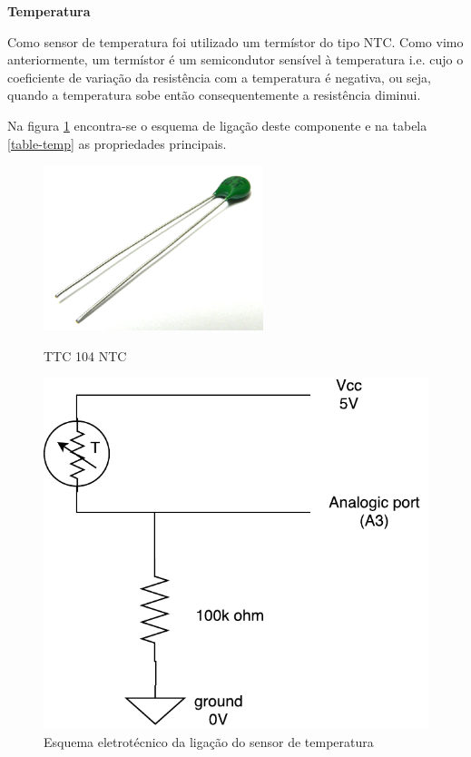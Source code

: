 \textbf{Temperatura}


Como sensor de temperatura foi utilizado um termístor do tipo \ac{NTC}. Como vimo anteriormente, um termístor é um semicondutor sensível à temperatura i.e. cujo o coeficiente de variação da resistência com a temperatura é negativa, ou seja, quando a temperatura sobe então consequentemente a resistência diminui. 

Na figura \ref{esquema-temp} encontra-se o esquema de ligação deste componente e na tabela \ref{table-temp} as propriedades principais. 

\begin{figure}[h]
	\centering
	\begin{minipage}[b]{0.4\textwidth}
		\includegraphics[width=\textwidth]{img/hardware/temperatura.jpg}
		\caption{TTC 104 NTC}
	\end{minipage}
	\hfill
	\begin{minipage}[b]{0.4\textwidth}
		\includegraphics[width=\textwidth]{img/hardware/temp-esquema.pdf}
		\caption{Esquema eletrotécnico da ligação do sensor de temperatura}
		\label{esquema-temp}
	\end{minipage}
\end{figure}




